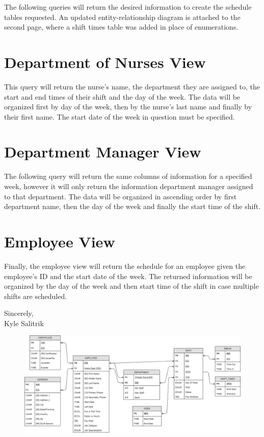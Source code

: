 \documentclass[letter,12pt]{texMemo}
\begin{document}
\maketitle

The following queries will return the desired information to create the schedule tables requested. An updated entity-relationship diagram is attached to the second page, where a shift times table was added in place of enumerations.

\section*{Department of Nurses View}
This query will return the nurse's name, the department they are assigned to, the start and end times of their shift and the day of the week. The data will be organized first by day of the week, then by the nurse's last name and finally by their first name. The start date of the week in question must be specified. 


\section*{Department Manager View}
The following query will return the same columns of information for a specified week, however it will only return the information department manager assigned to that department. The data will be organized in ascending order by first department name, then the day of the week and finally the start time of the shift.


\section*{Employee View}
Finally, the employee view will return the schedule for an employee given the employee's ID and the start date of the week. The returned information will be organized by the day of the week and then start time of the shift in case multiple shifts are scheduled.


\bigskip{}\decorativeline\bigskip{}

Sincerely,\\

\quad Kyle Salitrik

\newpage
\begin{figure}[H]
	\centering
	\includegraphics[angle=90, height=\textheight]{er_diag.png}
\end{figure}
\end{document}
